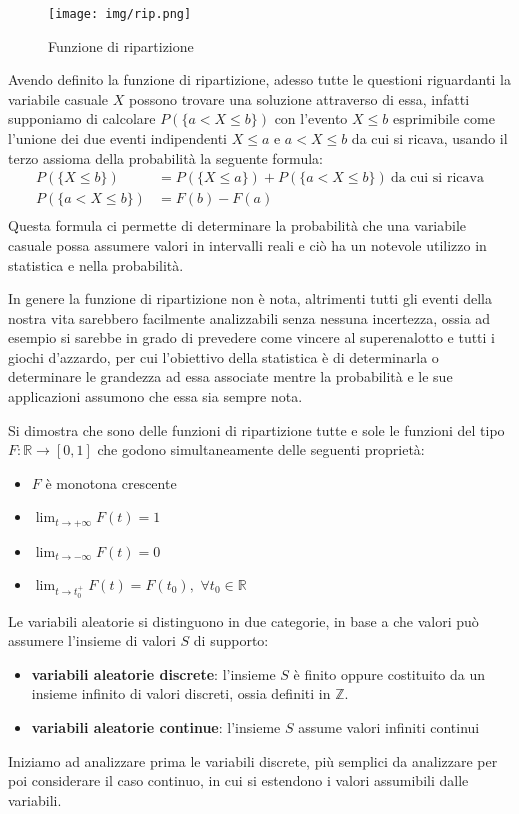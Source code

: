 \documentclass[a4paper,12pt, oneside]{book}
\newcommand{\numberset}{\mathbb}
\newcommand{\Z}{\numberset{Z}}
\newcommand{\R}{\numberset{R}}
\begin{document}
\begin{figure}
    \centering
    \caption{Funzione di ripartizione}
    \label{img:ripartizione}
    \texttt{[image: img/rip.png]}
\end{figure}
Avendo definito la funzione di ripartizione, adesso tutte le questioni riguardanti la variabile casuale $X$
possono trovare una soluzione attraverso di essa, infatti supponiamo di calcolare $P(\{a < X \leq b\})$
con l'evento ${X \leq b}$ esprimibile come l'unione dei due eventi indipendenti ${X \leq a}$ e ${a < X \leq b}$ 
da cui si ricava, usando il terzo assioma della probabilità la seguente formula:
\[ \begin{split}
        P(\{X \leq b\}) & = P(\{X \leq a\}) + P(\{a < X \leq b\}) \ \text{da cui si ricava} \\
        P(\{a < X \leq b\}) & = F(b) - F(a) \\
    \end{split} \]
Questa formula ci permette di determinare la probabilità che una variabile casuale possa assumere valori in intervalli reali
e ciò ha un notevole utilizzo in statistica e nella probabilità.

In genere la funzione di ripartizione non è nota, altrimenti tutti gli eventi della nostra vita sarebbero facilmente analizzabili
senza nessuna incertezza, ossia ad esempio si sarebbe in grado di prevedere come vincere al superenalotto e
tutti i giochi d'azzardo,  per cui l'obiettivo della statistica è di determinarla o determinare le grandezza ad essa associate
mentre la probabilità e le sue applicazioni assumono che essa sia  sempre nota.

Si dimostra che sono delle funzioni di ripartizione tutte e sole le funzioni del tipo $F: \R \to [0, 1]$
che godono simultaneamente delle seguenti proprietà:
\begin{itemize}
    \item $F$ è monotona crescente
    \item $\lim_{t \to +\infty} F(t) = 1$
    \item $\lim_{t \to -\infty} F(t) = 0$
    \item $\lim_{t \to t_0 ^ +} F(t) = F(t_0),\,\,\forall t_0 \in \R$
\end{itemize}
Le variabili aleatorie si distinguono in due categorie, in base a che valori può assumere 
l'insieme di valori $S$ di supporto:
\begin{itemize}
    \item \textbf{variabili aleatorie discrete}: l'insieme $S$ è finito oppure costituito da un insieme
        infinito di valori discreti, ossia definiti in $\Z$.
    \item \textbf{variabili aleatorie continue}: l'insieme $S$ assume valori infiniti continui
\end{itemize}
Iniziamo ad analizzare prima le variabili discrete, più semplici da analizzare per poi considerare il caso
continuo, in cui si estendono i valori assumibili dalle variabili.
\end{document}
